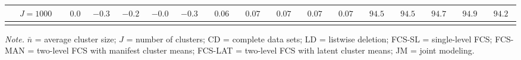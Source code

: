 \begin{sidewaystable}
\begin{threeparttable}
\begin{tabular}{llccccccccccccccc}
 & \nopagebreak $\;J=1000$  & $\phantom{-}0.0\phantom{0}$ & ${-}0.3\phantom{0}$ & ${-}0.2\phantom{0}$ & ${-}0.0\phantom{0}$ & ${-}0.3\phantom{0}$ & $\phantom{0}0.06\phantom{0}$ & $\phantom{0}0.07\phantom{0}$ & $\phantom{0}0.07\phantom{0}$ & $\phantom{0}0.07\phantom{0}$ & $\phantom{0}0.07\phantom{0}$ & $\phantom{0}94.5\phantom{0}$ & $\phantom{0}94.5\phantom{0}$ & $\phantom{0}94.7\phantom{0}$ & $\phantom{0}94.9\phantom{0}$ & $\phantom{0}94.2\phantom{0}$ \\
[0.5ex]\hline\\[-1.6ex] 
\end{tabular}
\begin{tablenotes}{\footnotesize \textit{Note.} $\bar{n}$ = average cluster size; $J$ = number of clusters; CD = complete data sets; LD = listwise deletion; FCS-SL = single-level FCS; FCS-MAN = two-level FCS with manifest cluster means; FCS-LAT = two-level FCS with latent cluster means; JM = joint modeling.}\end{tablenotes}
\end{threeparttable}
\end{sidewaystable}
